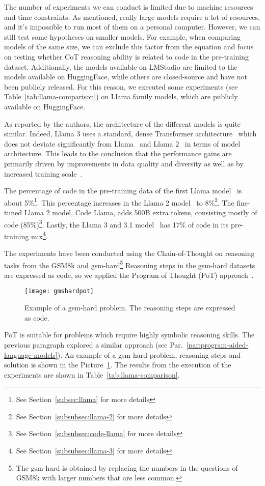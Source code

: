 The number of experiments we can conduct is limited due to machine resources and time constraints.
As mentioned, really large models require a lot of resources, and it's impossible to run most of them on a personal computer.
However, we can still test some hypotheses on smaller models.
For example, when comparing models of the same size, we can exclude this factor from the equation and focus on testing whether CoT reasoning ability is related to code in the pre-training dataset.
Additionally, the models available on LMStudio are limited to the models available on HuggingFace, while others are closed-source and have not been publicly released.
For this reason, we executed some experiments (see Table~\ref{tab:llama-comparison}) on Llama family models, which are publicly available on HuggingFace.

As reported by the authors, the architecture of the different models is quite similar.
Indeed, Llama 3 uses a standard, dense Transformer architecture~\cite{vaswani2023attention} which does not deviate significantly from Llama~\cite{touvron2023llama} and Llama 2~\cite{touvron2023llama2} in terms of model architecture.
This leads to the conclusion that the performance gains are primarily driven by improvements in data quality and diversity as well as by increased training scale~\cite{llama3}.

The percentage of code in the pre-training data of the first Llama model~\cite{touvron2023llama} is about 5\%\footnote{See Section~\ref{subsec:llama} for more details}.
This percentage increases in the Llama 2 model~\cite{touvron2023llama2} to 8\%\footnote{See Section~\ref{subsubsec:llama-2} for more details}.
The fine-tuned Llama 2 model, Code Llama\cite{roziere2024codellamaopenfoundation}, adds 500B extra tokens, consisting mostly of code (85\%)\footnote{See Section~\ref{subsubsec:code-llama} for more details}.
Lastly, the Llama 3 and 3.1 model~\cite{llama3} has 17\% of code in its pre-training mix\footnote{See Section~\ref{subsubsec:llama-3} for more details}.

The experiments have been conducted using the Chain-of-Thought on reasoning tasks from the GSM8k and gsm-hard\footnote{The gsm-hard is obtained by replacing the numbers in the questions of GSM8k with larger numbers that are less common.}
Reasoning steps in the gsm-hard datasets are expressed as code, so we applied the Program of Thought (PoT) approach~\cite{chen2022program}.
\begin{figure}[h!]
	\centering
	\texttt{[image: gmshardpot]}
	\caption{Example of a gsm-hard problem. The reasoning steps are expressed as code.}
	\label{fig:pot-example}
\end{figure}
PoT is suitable for problems which require highly symbolic reasoning skills.
The previous paragraph explored a similar approach (see Par.~\ref{par:program-aided-language-models}).
An example of a gsm-hard problem, reasoning steps and solution is shown in the Picture~\ref{fig:pot-example}.
The results from the execution of the experiments are shown in Table~\ref{tab:llama-comparison}.

